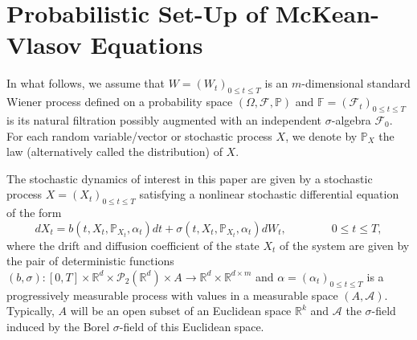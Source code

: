 \documentclass[11pt]{amsart}
\begin{document}
\section{\textbf{Probabilistic Set-Up of McKean-Vlasov Equations}}
\label{se:mkv}

In what follows, we assume that $W=(W_t)_{0\le t\le T}$ is an $m$-dimensional standard Wiener process defined on a probability space $(\Omega,{\mathcal F},{\mathbb P})$ and ${\mathbb F}=({\mathcal F}_t)_{0\le t\le T}$ is its natural filtration possibly augmented 
with an independent $\sigma$-algebra ${\mathcal F}_{0}$.  For each random variable/vector or stochastic process $X$, we denote
by ${\mathbb P}_X$ the law (alternatively called the distribution) of $X$. 

The stochastic dynamics of interest in this paper are given by a stochastic process
$ X=(X_t)_{0\le t\le T}$ satisfying a nonlinear stochastic differential equation of the form
\begin{equation}
\label{fo:mkvsde}
dX_t=b(t,X_t,{{\mathbb P}_{X_t}}, \alpha_t)dt+\sigma(t,X_t,{{\mathbb P}_{X_t}},\alpha_t)dW_t, \qquad\qquad 0\le t\le T,
\end{equation}
where the drift and diffusion coefficient of the state $X_t$ of the system are given by the pair of deterministic functions $(b,\sigma):[0,T]\times{\mathbb R}^d\times {\mathcal P}_2({\mathbb R}^d)\times A\rightarrow {\mathbb R}^{d} \times {\mathbb R}^{d \times m}$ and $ \alpha=(\alpha_t)_{0\le t\le T}$ is a progressively measurable process with values in a measurable space $(A,{\mathcal A})$.
Typically, $A$ will be an open subset of an Euclidean space ${\mathbb R}^k$ and ${\mathcal A}$ the $\sigma$-field induced by the Borel $\sigma$-field of this Euclidean space. 
\end{document}
